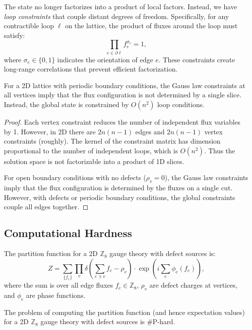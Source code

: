The state no longer factorizes into a product of local factors. Instead, we have \textit{loop constraints} that couple distant degrees of freedom. Specifically, for any contractible loop $\ell$ on the lattice, the product of fluxes around the loop must satisfy:
\begin{equation}
\prod_{e \in \partial \ell} f_e^{\sigma_e} = 1,
\end{equation}
where $\sigma_e \in \{0,1\}$ indicates the orientation of edge $e$. These constraints create long-range correlations that prevent efficient factorization.

\begin{lemma}
For a 2D lattice with periodic boundary conditions, the Gauss law constraints at all vertices imply that the flux configuration is not determined by a single slice. Instead, the global state is constrained by $O(n^2)$ loop conditions.
\end{lemma}

\begin{proof}
Each vertex constraint reduces the number of independent flux variables by 1. However, in 2D there are $2n(n-1)$ edges and $2n(n-1)$ vertex constraints (roughly). The kernel of the constraint matrix has dimension proportional to the number of independent loops, which is $O(n^2)$. Thus the solution space is not factorizable into a product of 1D slices.

For open boundary conditions with no defects ($\rho_v = 0$), the Gauss law constraints imply that the flux configuration is determined by the fluxes on a single cut. However, with defects or periodic boundary conditions, the global constraints couple all edges together.
\end{proof}

\subsection{Computational Hardness}

The partition function for a 2D $\mathbb{Z}_8$ gauge theory with defect sources is:
\begin{equation}
Z = \sum_{\{f_e\}} \prod_{v} \delta\left(\sum_{e \ni v} f_e - \rho_v\right) \cdot \exp\left(i \sum_{e} \phi_e(f_e)\right),
\end{equation}
where the sum is over all edge fluxes $f_e \in \mathbb{Z}_8$, $\rho_v$ are defect charges at vertices, and $\phi_e$ are phase functions.

\begin{theorem}[2D Hardness]
\label{thm:2d-hard}
The problem of computing the partition function (and hence expectation values) for a 2D $\mathbb{Z}_8$ gauge theory with defect sources is \#P-hard.
\end{theorem}

